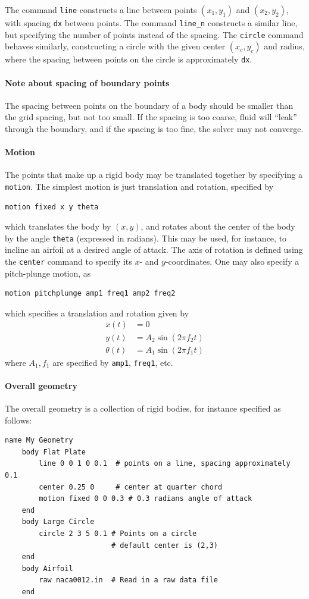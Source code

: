 \documentclass[11pt]{article}
\begin{document}
The command {\tt line} constructs a line between points $(x_1,y_1)$ and $(x_2,y_2)$, with spacing {\tt dx} between points.  The command {\tt line\_n} constructs a similar line, but specifying the number of points instead of the spacing.  The {\tt circle} command behaves similarly, constructing a circle with the given center $(x_c,y_c)$ and radius, where the spacing between points on the circle is approximately {\tt dx}.

\paragraph{Note about spacing of boundary points}
The spacing between points on the boundary of a body should be smaller than the grid spacing, but not too small.  If the spacing is too coarse, fluid will ``leak'' through the boundary, and if the spacing is too fine, the solver may not converge.

\paragraph{Motion}
The points that make up a rigid body may be translated together by specifying a {\tt motion}.  The simplest motion is just translation and rotation, specified by
\begin{Verbatim}
motion fixed x y theta
\end{Verbatim}
which translates the body by $(x,y)$, and rotates about the center of the body by the angle {\tt theta} (expressed in radians).  This may be used, for instance, to incline an airfoil at a desired angle of attack.  The axis of rotation is defined using the {\tt center} command to specify its $x$- and $y$-coordinates.  One may also specify a pitch-plunge motion, as
\begin{Verbatim}
motion pitchplunge amp1 freq1 amp2 freq2
\end{Verbatim}
which specifies a translation and rotation given by
\begin{align*}
x(t) &= 0\\
y(t) &= A_2 \sin(2\pi f_2 t)\\
\theta(t) &= A_1 \sin(2\pi f_1 t)
\end{align*}
where $A_1,f_1$ are specified by {\tt amp1}, {\tt freq1}, etc.

\paragraph{Overall geometry}
The overall geometry is a collection of rigid bodies, for instance specified as follows:
\begin{Verbatim}[gobble=4]
    name My Geometry
    body Flat Plate
        line 0 0 1 0 0.1  # points on a line, spacing approximately 0.1
        center 0.25 0     # center at quarter chord
        motion fixed 0 0 0.3 # 0.3 radians angle of attack
    end
    body Large Circle
        circle 2 3 5 0.1 # Points on a circle
                         # default center is (2,3)
    end
    body Airfoil
        raw naca0012.in  # Read in a raw data file
    end
\end{Verbatim}
\end{document}
